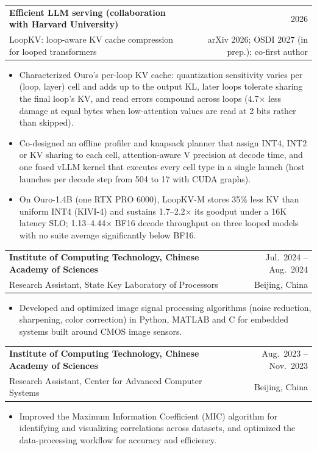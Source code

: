 \documentclass[10pt,letterpaper]{article}
\makeatletter
\newcommand{\entry}[4]{%
  \begin{tabularx}{\linewidth}{@{}X r@{}}
    \textbf{#1} & #2 \\
    #3 & #4 \\
  \end{tabularx}\par}
\makeatother
\begin{document}
\vspace{3pt}
\entry{Efficient LLM serving (collaboration with Harvard University)}{2026}
      {LoopKV: loop-aware KV cache compression for looped transformers}{arXiv 2026; OSDI 2027 (in prep.); co-first author}
\begin{itemize}
  \item Characterized Ouro's per-loop KV cache: quantization sensitivity varies per (loop, layer) cell and adds up to the output KL, later loops tolerate sharing the final loop's KV, and read errors compound across loops (4.7$\times$ less damage at equal bytes when low-attention values are read at 2 bits rather than skipped).
  \item Co-designed an offline profiler and knapsack planner that assign INT4, INT2 or KV sharing to each cell, attention-aware V precision at decode time, and one fused vLLM kernel that executes every cell type in a single launch (host launches per decode step from 504 to 17 with CUDA graphs).
  \item On Ouro-1.4B (one RTX PRO 6000), LoopKV-M stores 35\% less KV than uniform INT4 (KIVI-4) and sustains 1.7--2.2$\times$ its goodput under a 16K latency SLO; 1.13--4.44$\times$ BF16 decode throughput on three looped models with no suite average significantly below BF16.
\end{itemize}

\vspace{3pt}
\entry{Institute of Computing Technology, Chinese Academy of Sciences}{Jul.\ 2024 -- Aug.\ 2024}
      {Research Assistant, State Key Laboratory of Processors}{Beijing, China}
\begin{itemize}
  \item Developed and optimized image signal processing algorithms (noise reduction, sharpening, color correction) in Python, MATLAB and C for embedded systems built around CMOS image sensors.
\end{itemize}
\vspace{2pt}
\entry{Institute of Computing Technology, Chinese Academy of Sciences}{Aug.\ 2023 -- Nov.\ 2023}
      {Research Assistant, Center for Advanced Computer Systems}{Beijing, China}
\begin{itemize}
  \item Improved the Maximum Information Coefficient (MIC) algorithm for identifying and visualizing correlations across datasets, and optimized the data-processing workflow for accuracy and efficiency.
\end{itemize}
\end{document}
